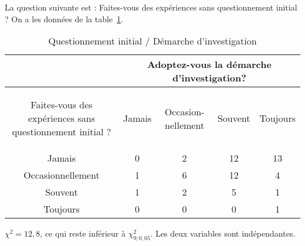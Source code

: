 La question suivante est : \og Faites-vous des expériences sans questionnement initial ? \fg{} On a les données de la table~\ref{questionnement}.
\begin{table}[h!btp]
\centering
\caption{\label{questionnement} Questionnement initial / Démarche d’investigation}
	\begin{tabular}{|c|c|c|c|c|}
	\cline{2-5}
	\multicolumn{1}{c|}{} & \multicolumn{4}{c|}{Adoptez-vous la démarche d’investigation?} \\ 
	\hline 
	\begin{minipage}[l]{3.7cm}\begin{flushleft}Faites-vous des expériences sans questionnement initial ?\end{flushleft}\end{minipage} & Jamais & \begin{minipage}[c]{2cm}Occasion- nellement\end{minipage} & Souvent & Toujours \\ 
	\hline 
	Jamais & 0 & 2 & 12 & 13 \\ 
	\hline 
	Occasionnellement & 1 & 6 & 12 & 4 \\ 
	\hline 
	Souvent & 1 & 2 & 5 & 1 \\ 
	\hline 
	Toujours & 0 & 0 & 0 & 1 \\ 
	\hline 
	\end{tabular}
\end{table}
$\chi^2=12,8$, ce qui reste inférieur à $\chi^2_{9;0,05}$. Les deux variables sont indépendantes.

